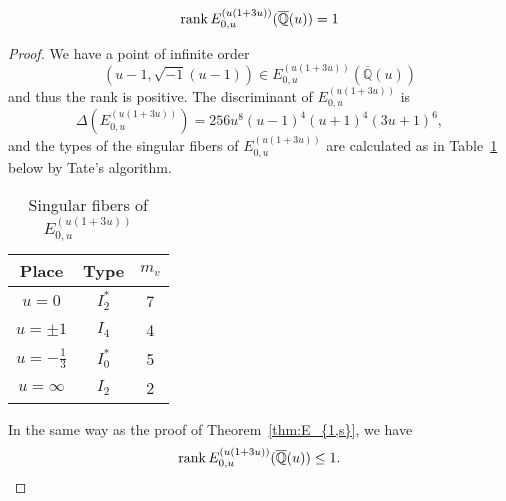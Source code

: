 \documentclass[main]{subfiles}
\begin{document}
\begin{thm}
    \begin{equation}
        \operatorname{rank} E_{0,u}^{(u(1 + 3u))}(\overline{\mathbb{Q}}(u)) = 1
    \end{equation}
\end{thm}
\begin{proof}
    We have a point of infinite order
    \begin{equation}
        (u - 1, \sqrt{-1}(u - 1)) \in E_{0,u}^{(u(1 + 3u))}(\overline{\mathbb{Q}}(u))
    \end{equation}
    and thus the rank is positive.
    The discriminant of $E_{0,u}^{(u(1 + 3u))}$ is
    \begin{equation}
        \Delta(E_{0,u}^{(u(1 + 3u))}) = 256u^{8}(u - 1)^{4}(u + 1)^{4}(3u + 1)^{6},
    \end{equation}
    and the types of the singular fibers of $E_{0,u}^{(u(1 + 3u))}$ are calculated as in Table~\ref{tab:E_{0,u}^{(u(1 + 3u))}} below by Tate's algorithm.
    \begin{table}[h]
        \centering
        \caption{Singular fibers of $E_{0,u}^{(u(1 + 3u))}$}
        \begin{tabular}{|c|c|c|}
            \hline
            Place            & Type    & $m_v$ \\
            \hline
            $u=0$            & $I_2^*$ & 7     \\
            $u=\pm 1$        & $I_4$   & 4     \\
            $u=-\frac{1}{3}$ & $I_0^*$ & 5     \\
            $u=\infty$       & $I_2$   & 2     \\
            \hline
        \end{tabular}
        \label{tab:E_{0,u}^{(u(1 + 3u))}}
    \end{table}
    In the same way as the proof of Theorem~\ref{thm:E_{1,s}}, we have
    \begin{equation}
        \operatorname{rank} E_{0,u}^{(u(1 + 3u))}(\overline{\mathbb{Q}}(u)) \leq 1.
    \end{equation}
\end{proof}
\end{document}
